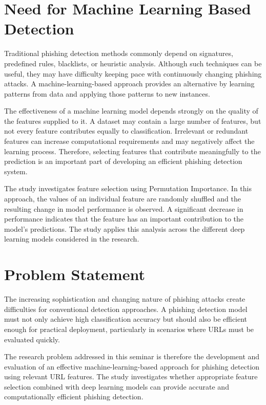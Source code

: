 \documentclass[12pt,a4paper]{report}
\begin{document}
\section{Need for Machine Learning Based Detection}

Traditional phishing detection methods commonly depend on
signatures, predefined rules, blacklists, or heuristic analysis.
Although such techniques can be useful, they may have difficulty
keeping pace with continuously changing phishing attacks. A
machine-learning-based approach provides an alternative by learning
patterns from data and applying those patterns to new instances.

The effectiveness of a machine learning model depends strongly on
the quality of the features supplied to it. A dataset may contain a
large number of features, but not every feature contributes equally
to classification. Irrelevant or redundant features can increase
computational requirements and may negatively affect the learning
process. Therefore, selecting features that contribute meaningfully
to the prediction is an important part of developing an efficient
phishing detection system.

The study investigates feature selection using Permutation
Importance. In this approach, the values of an individual feature
are randomly shuffled and the resulting change in model performance
is observed. A significant decrease in performance indicates that
the feature has an important contribution to the model's
predictions. The study applies this analysis across the different
deep learning models considered in the research.

\section{Problem Statement}

The increasing sophistication and changing nature of phishing
attacks create difficulties for conventional detection approaches.
A phishing detection model must not only achieve high classification
accuracy but should also be efficient enough for practical
deployment, particularly in scenarios where URLs must be evaluated
quickly.

The research problem addressed in this seminar is therefore the
development and evaluation of an effective machine-learning-based
approach for phishing detection using relevant URL features. The
study investigates whether appropriate feature selection combined
with deep learning models can provide accurate and computationally
efficient phishing detection.
\end{document}
